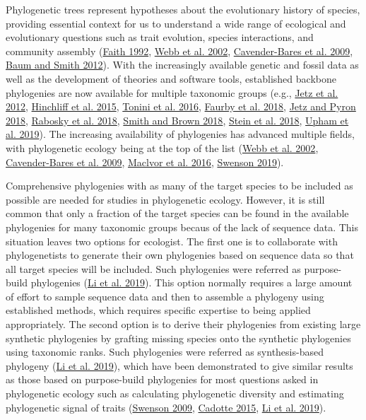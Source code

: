 \documentclass[
  12pt,
]{article}
\begin{document}
Phylogenetic trees represent hypotheses about the evolutionary history of species, providing essential context for us to understand a wide range of ecological and evolutionary questions such as trait evolution, species interactions, and community assembly (\protect\hyperlink{ref-faith1992conservation}{Faith 1992}, \protect\hyperlink{ref-webb2002phylogenies}{Webb et al. 2002}, \protect\hyperlink{ref-cavender2009merging}{Cavender-Bares et al. 2009}, \protect\hyperlink{ref-baum2012tree}{Baum and Smith 2012}). With the increasingly available genetic and fossil data as well as the development of theories and software tools, established backbone phylogenies are now available for multiple taxonomic groups (e.g., \protect\hyperlink{ref-jetz2012global}{Jetz et al. 2012}, \protect\hyperlink{ref-hinchliff2015synthesis}{Hinchliff et al. 2015}, \protect\hyperlink{ref-tonini2016fully}{Tonini et al. 2016}, \protect\hyperlink{ref-faurby2018phylacine}{Faurby et al. 2018}, \protect\hyperlink{ref-jetz2018interplay}{Jetz and Pyron 2018}, \protect\hyperlink{ref-rabosky2018inverse}{Rabosky et al. 2018}, \protect\hyperlink{ref-smith2018constructing}{Smith and Brown 2018}, \protect\hyperlink{ref-stein2018global}{Stein et al. 2018}, \protect\hyperlink{ref-upham2019inferring}{Upham et al. 2019}). The increasing availability of phylogenies has advanced multiple fields, with phylogenetic ecology being at the top of the list (\protect\hyperlink{ref-webb2002phylogenies}{Webb et al. 2002}, \protect\hyperlink{ref-cavender2009merging}{Cavender-Bares et al. 2009}, \protect\hyperlink{ref-maclvor2016phylogenetic}{Maclvor et al. 2016}, \protect\hyperlink{ref-swenson2019phylogenetic}{Swenson 2019}).

Comprehensive phylogenies with as many of the target species to be included as possible are needed for studies in phylogenetic ecology. However, it is still common that only a fraction of the target species can be found in the available phylogenies for many taxonomic groups becaus of the lack of sequence data. This situation leaves two options for ecologist. The first one is to collaborate with phylogenetists to generate their own phylogenies based on sequence data so that all target species will be included. Such phylogenies were referred as purpose-build phylogenies (\protect\hyperlink{ref-li2019common}{Li et al. 2019}). This option normally requires a large amount of effort to sample sequence data and then to assemble a phylogeny using established methods, which requires specific expertise to being applied appropriately. The second option is to derive their phylogenies from existing large synthetic phylogenies by grafting missing species onto the synthetic phylogenies using taxonomic ranks. Such phylogenies were referred as synthesis-based phylogeny (\protect\hyperlink{ref-li2019common}{Li et al. 2019}), which have been demonstrated to give similar results as those based on purpose-build phylogenies for most questions asked in phylogenetic ecology such as calculating phylogenetic diversity and estimating phylogenetic signal of traits (\protect\hyperlink{ref-swenson2009phylogenetic}{Swenson 2009}, \protect\hyperlink{ref-cadotte2015phylogenetic}{Cadotte 2015}, \protect\hyperlink{ref-li2019common}{Li et al. 2019}).
\end{document}
